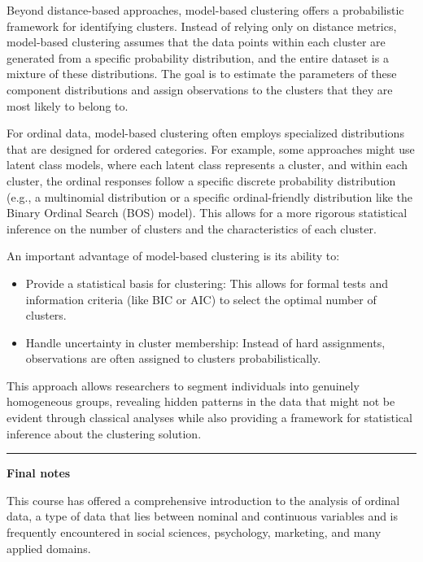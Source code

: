\documentclass[
  letterpaper,
  DIV=11,
  numbers=noendperiod]{scrartcl}
\begin{document}
Beyond distance-based approaches, model-based clustering offers a
probabilistic framework for identifying clusters. Instead of relying
only on distance metrics, model-based clustering assumes that the data
points within each cluster are generated from a specific probability
distribution, and the entire dataset is a mixture of these
distributions. The goal is to estimate the parameters of these component
distributions and assign observations to the clusters that they are most
likely to belong to.

For ordinal data, model-based clustering often employs specialized
distributions that are designed for ordered categories. For example,
some approaches might use latent class models, where each latent class
represents a cluster, and within each cluster, the ordinal responses
follow a specific discrete probability distribution (e.g., a multinomial
distribution or a specific ordinal-friendly distribution like the Binary
Ordinal Search (BOS) model). This allows for a more rigorous statistical
inference on the number of clusters and the characteristics of each
cluster.

An important advantage of model-based clustering is its ability to:

\begin{itemize}
\item
  Provide a statistical basis for clustering: This allows for formal
  tests and information criteria (like BIC or AIC) to select the optimal
  number of clusters.
\item
  Handle uncertainty in cluster membership: Instead of hard assignments,
  observations are often assigned to clusters probabilistically.
\end{itemize}

This approach allows researchers to segment individuals into genuinely
homogeneous groups, revealing hidden patterns in the data that might not
be evident through classical analyses while also providing a framework
for statistical inference about the clustering solution.

\begin{center}\rule{0.5\linewidth}{0.5pt}\end{center}

\textbf{Final notes}

This course has offered a comprehensive introduction to the analysis of
ordinal data, a type of data that lies between nominal and continuous
variables and is frequently encountered in social sciences, psychology,
marketing, and many applied domains.
\end{document}
